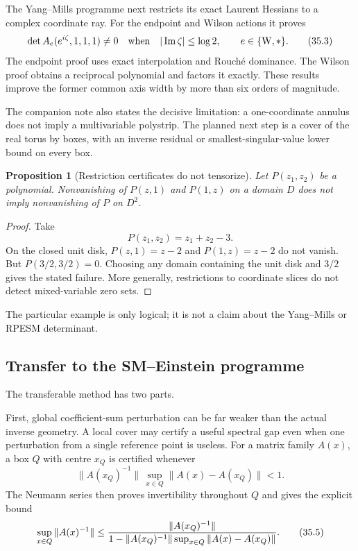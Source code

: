 \documentclass[11pt]{article}
\newtheorem{proposition}[theorem]{Proposition}
\theoremstyle{remark}
\begin{document}
The Yang--Mills programme next restricts its exact Laurent Hessians
to a complex coordinate ray.  For the endpoint and Wilson actions it
proves
\begin{equation}
 \det A_e(e^{i\zeta},1,1,1)\ne0
 \quad\text{when}\quad|\operatorname{Im}\zeta|\leq\log2,
 \qquad e\in\{{\rm W},*\}.                         \tag{35.3}
\end{equation}
The endpoint proof uses exact interpolation and Rouch\'e dominance.
The Wilson proof obtains a reciprocal polynomial and factors it
exactly.  These results improve the former common axis width by more
than six orders of magnitude.

The companion note also states the decisive limitation: a
one-coordinate annulus does not imply a multivariable polystrip.
The planned next step is a cover of the real torus by boxes, with an
inverse residual or smallest-singular-value lower bound on every
box.

\begin{proposition}[Restriction certificates do not tensorize]
\label{prop:v12v35-no-tensorization}
Let \(P(z_1,z_2)\) be a polynomial.  Nonvanishing of
\(P(z,1)\) and \(P(1,z)\) on a domain \(D\) does not imply
nonvanishing of \(P\) on \(D^2\).
\end{proposition}

\begin{proof}
Take
\[
 P(z_1,z_2)=z_1+z_2-3.
\]
On the closed unit disk,
\(P(z,1)=z-2\) and \(P(1,z)=z-2\) do not vanish.  But
\(P(3/2,3/2)=0\).  Choosing any domain containing the unit disk and
\(3/2\) gives the stated failure.  More generally, restrictions to
coordinate slices do not detect mixed-variable zero sets.
\end{proof}

The particular example is only logical; it is not a claim about the
Yang--Mills or RPESM determinant.

\subsection{Transfer to the SM--Einstein programme}

The transferable method has two parts.

First, global coefficient-sum perturbation can be far weaker than
the actual inverse geometry.  A local cover may certify a useful
spectral gap even when one perturbation from a single reference
point is useless.  For a matrix family \(A(x)\), a box \(Q\) with
centre \(x_Q\) is certified whenever
\begin{equation}
 \|A(x_Q)^{-1}\|\,
 \sup_{x\in Q}\|A(x)-A(x_Q)\|<1.                \tag{35.4}
\end{equation}
The Neumann series then proves invertibility throughout \(Q\) and
gives the explicit bound
\begin{equation}
 \sup_{x\in Q}\|A(x)^{-1}\|
 \leq
 {\|A(x_Q)^{-1}\|\over
  1-\|A(x_Q)^{-1}\|
       \sup_{x\in Q}\|A(x)-A(x_Q)\|}.             \tag{35.5}
\end{equation}
\end{document}
